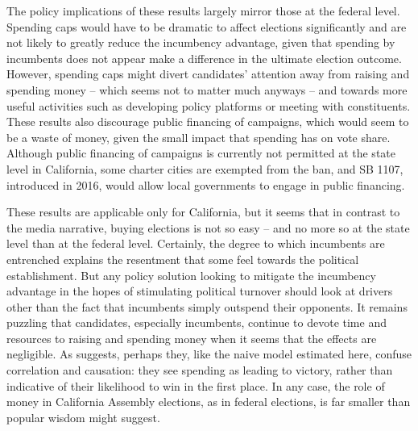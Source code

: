 \documentclass{article}
\begin{document}
The policy implications of these results largely mirror those at the federal level. Spending caps would have to be dramatic to affect elections significantly and are not likely to greatly reduce the incumbency advantage, given that spending by incumbents does not appear make a difference in the ultimate election outcome. However, spending caps might divert candidates' attention away from raising and spending money -- which seems not to matter much anyways -- and towards more useful activities such as developing policy platforms or meeting with constituents. These results also discourage public financing of campaigns, which would seem to be a waste of money, given the small impact that spending has on vote share. Although public financing of campaigns is currently not permitted at the state level in California, some charter cities are exempted from the ban, and SB 1107, introduced in 2016, would allow local governments to engage in public financing.

These results are applicable only for California, but it seems that in contrast to the media narrative, buying elections is not so easy -- and no more so at the state level than at the federal level. Certainly, the degree to which incumbents are entrenched explains the resentment that some feel towards the political establishment. But any policy solution looking to mitigate the incumbency advantage in the hopes of stimulating political turnover should look at drivers other than the fact that incumbents simply outspend their opponents. It remains puzzling that candidates, especially incumbents, continue to devote time and resources to raising and spending money when it seems that the effects are negligible. As \cite{levitt-1994} suggests, perhaps they, like the naive model estimated here, confuse correlation and causation: they see spending as leading to victory, rather than indicative of their likelihood to win in the first place. In any case, the role of money in California Assembly elections, as in federal elections, is far smaller than popular wisdom might suggest.

\pagebreak



\pagebreak
\end{document}
